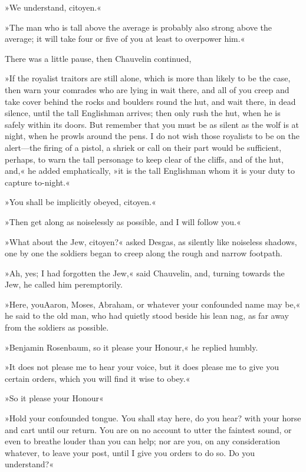 »We understand, citoyen.«

»The man who is tall above the average is probably also strong above the average; it will take four or five of you at least to overpower him.«

There was a little pause, then Chauvelin continued,\longdash


»If the royalist traitors are still alone, which is more than likely to be the case, then warn your comrades who are lying in wait there, and all of you creep and take cover behind the rocks and boulders round the hut, and wait there, in dead silence, until the tall Englishman arrives; then only rush the hut, when he is safely within its doors. But remember that you must be as silent as the wolf is at night, when he prowls around the pens. I do not wish those royalists to be on the alert—the firing of a pistol, a shriek or call on their part would be sufficient, perhaps, to warn the tall personage to keep clear of the cliffs, and of the hut, and,« he added emphatically, »it is the tall Englishman whom it is your duty to capture to-night.«

»You shall be implicitly obeyed, citoyen.«

»Then get along as noiselessly as possible, and I will follow you.«

»What about the Jew, citoyen?« asked Desgas, as silently like noiseless shadows, one by one the soldiers began to creep along the rough and narrow footpath.

»Ah, yes; I had forgotten the Jew,« said Chauvelin, and, turning towards the Jew, he called him peremptorily.

»Here, you\textellipsis \allowbreak  Aaron, Moses, Abraham, or whatever your confounded name may be,« he said to the old man, who had quietly stood beside his lean nag, as far away from the soldiers as possible.

»Benjamin Rosenbaum, so it please your Honour,« he replied humbly.

»It does not please me to hear your voice, but it does please me to give you certain orders, which you will find it wise to obey.«

»So it please your Honour\textellipsis«

»Hold your confounded tongue. You shall stay here, do you hear? with your horse and cart until our return. You are on no account to utter the faintest sound, or even to breathe louder than you can help; nor are you, on any consideration whatever, to leave your post, until I give you orders to do so. Do you understand?«

